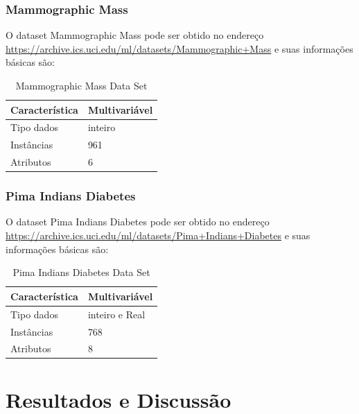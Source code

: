 \documentclass[12pt, a4paper, brazil]{article}
\begin{document}
\subsubsection{Mammographic Mass}
O dataset Mammographic Mass pode ser obtido no endereço \url{https://archive.ics.uci.edu/ml/datasets/Mammographic+Mass} e suas informações básicas são:
\begin{table}[!ht]
\centering
\caption{Mammographic Mass Data Set}
\label{mammographictable}
\begin{tabular}{|l|l|}
\hline
Característica & Multivariável\\
\hline
Tipo dados & inteiro \\
\hline
Instâncias & 961 \\
\hline
Atributos & 6\\
\hline
\end{tabular}
\end{table}

\subsubsection{Pima Indians Diabetes}
O dataset Pima Indians Diabetes pode ser obtido no endereço \url{https://archive.ics.uci.edu/ml/datasets/Pima+Indians+Diabetes} e suas informações básicas são:
\begin{table}[!ht]
\centering
\caption{Pima Indians Diabetes Data Set}
\label{pimatable}
\begin{tabular}{|l|l|}
\hline
Característica & Multivariável\\
\hline
Tipo dados & inteiro e Real \\
\hline
Instâncias & 768 \\
\hline
Atributos & 8\\
\hline
\end{tabular}
\end{table}

\section{Resultados e Discussão}
\end{document}
